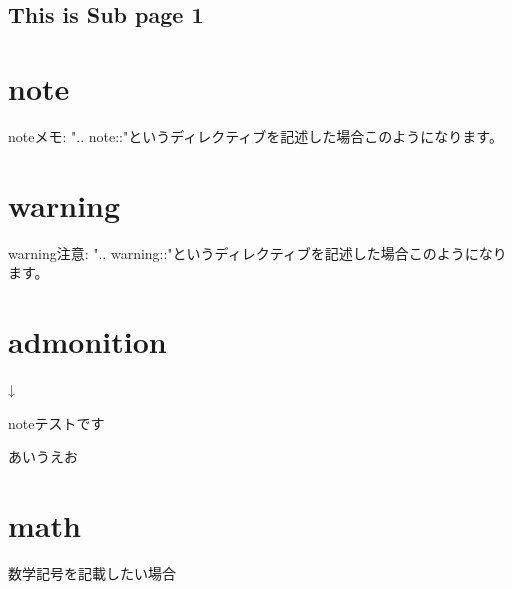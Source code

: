 \documentclass[letterpaper,10pt,dvipdfmx,openany,oneside]{sphinxmanual}
\begin{document}
\subsection{This is Sub page 1}
\label{\detokenize{source/2.chapter/subpage/sub2:this-is-sub-page-1}}\label{\detokenize{source/2.chapter/subpage/sub2::doc}}

\section{note}
\label{\detokenize{source/2.chapter/directive:note}}
\begin{sphinxadmonition}{note}{メモ:}
".. note::"というディレクティブを記述した場合このようになります。
\end{sphinxadmonition}


\section{warning}
\label{\detokenize{source/2.chapter/directive:warning}}
\begin{sphinxadmonition}{warning}{注意:}
".. warning::"というディレクティブを記述した場合このようになります。
\end{sphinxadmonition}


\section{admonition}
\label{\detokenize{source/2.chapter/directive:admonition}}
%
\begin{sphinxVerbatim}[commandchars=\\\{\}]
  

\end{sphinxVerbatim}

↓

\begin{sphinxadmonition}{note}{テストです}

あいうえお
\end{sphinxadmonition}


\section{math}
\label{\detokenize{source/2.chapter/directive:math}}
数学記号を記載したい場合

%
\begin{sphinxVerbatim}[commandchars=\\\{\}]
 

           
\end{sphinxVerbatim}
\end{document}
